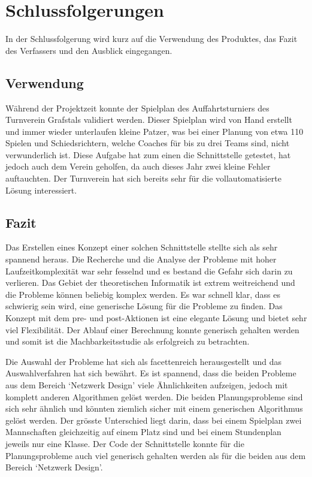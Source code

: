%
%


\chapter{Schlussfolgerungen}\label{chap.Schlussfolgerungen}
In der Schlussfolgerung wird kurz auf die Verwendung des Produktes, das Fazit des Verfassers und den Ausblick eingegangen.

\section{Verwendung}\label{fazit_verwendung}
Während der Projektzeit konnte der Spielplan des Auffahrtsturniers des Turnverein Grafstals validiert werden. Dieser Spielplan wird von Hand erstellt und immer wieder unterlaufen 
kleine Patzer, was bei einer Planung von etwa 110 Spielen und Schiedsrichtern, welche Coaches für bis zu drei Teams sind, nicht verwunderlich ist. Diese Aufgabe hat zum einen die Schnittstelle 
getestet, hat jedoch auch dem Verein geholfen, da auch dieses Jahr zwei kleine Fehler auftauchten. Der Turnverein hat sich bereits sehr für die vollautomatisierte Lösung interessiert.

\section{Fazit}\label{fazit}

Das Erstellen eines Konzept einer solchen Schnittstelle stellte sich als sehr spannend heraus. Die Recherche und die Analyse der Probleme mit hoher Laufzeitkomplexität war sehr fesselnd und es 
bestand die Gefahr sich darin zu verlieren. Das Gebiet der theoretischen Informatik ist extrem weitreichend und die Probleme können beliebig komplex werden. Es war schnell klar, dass es schwierig 
sein wird, eine generische Lösung für die Probleme zu finden. Das Konzept mit dem pre- und post-Aktionen ist eine elegante Lösung und bietet sehr viel Flexibilität. Der Ablauf einer Berechnung 
konnte generisch gehalten werden und somit ist die Machbarkeitsstudie als erfolgreich zu betrachten.

Die Auswahl der Probleme hat sich als facettenreich herausgestellt und das Auswahlverfahren hat sich bewährt. Es ist spannend, dass die beiden Probleme aus dem Bereich `Netzwerk Design' 
viele Ähnlichkeiten aufzeigen, jedoch mit komplett anderen Algorithmen gelöst werden. Die beiden Planungsprobleme sind sich sehr ähnlich und könnten ziemlich sicher mit einem generischen 
Algorithmus gelöst werden. Der grösste Unterschied liegt darin, dass bei einem Spielplan zwei Mannschaften gleichzeitig auf einem Platz sind und bei einem 
Stundenplan jeweils nur eine Klasse. Der Code der Schnittstelle konnte für die Planungsprobleme auch viel generisch gehalten werden als für die beiden aus dem Bereich `Netzwerk Design'.

